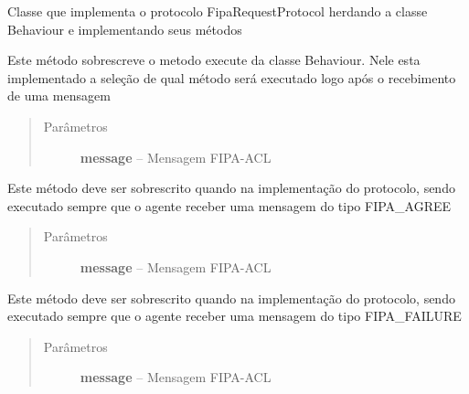 \documentclass[letterpaper,10pt,brazil]{sphinxmanual}
\begin{document}
\begin{fulllineitems}
\label{api:pade.behaviours.protocols.FipaRequestProtocol}
Classe que implementa o protocolo FipaRequestProtocol
herdando a classe Behaviour e implementando seus métodos

\begin{fulllineitems}
\label{api:pade.behaviours.protocols.FipaRequestProtocol.execute}
Este método sobrescreve o metodo execute da classe 
Behaviour. Nele esta implementado a seleção de qual
método será executado logo após o recebimento de uma
mensagem
\begin{quote}\begin{description}
\item[{Parâmetros}] \leavevmode
\textbf{message} -- Mensagem FIPA-ACL

\end{description}\end{quote}

\end{fulllineitems}


\begin{fulllineitems}
\label{api:pade.behaviours.protocols.FipaRequestProtocol.handle_agree}
Este método deve ser sobrescrito quando na implementação
do protocolo, sendo executado sempre que o agente receber
uma mensagem do tipo FIPA\_AGREE
\begin{quote}\begin{description}
\item[{Parâmetros}] \leavevmode
\textbf{message} -- Mensagem FIPA-ACL

\end{description}\end{quote}

\end{fulllineitems}


\begin{fulllineitems}
\label{api:pade.behaviours.protocols.FipaRequestProtocol.handle_failure}
Este método deve ser sobrescrito quando na implementação
do protocolo, sendo executado sempre que o agente receber
uma mensagem do tipo FIPA\_FAILURE
\begin{quote}\begin{description}
\item[{Parâmetros}] \leavevmode
\textbf{message} -- Mensagem FIPA-ACL


\end{description}
\end{quote}
\end{fulllineitems}
\end{fulllineitems}
\end{document}
